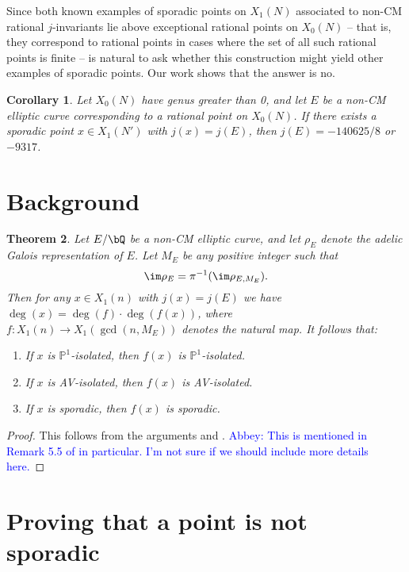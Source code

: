 \documentclass[11pt,reqno]{amsart}
\theoremstyle{plain}
\newtheorem{theorem}{Theorem}%
\newtheorem{corollary}[theorem]{Corollary}
\theoremstyle{definition}
\newcommand{\Q}{\bQ}
\newcommand{\abbey}[1]{\textcolor{blue}{Abbey: #1}}
\begin{document}
Since both known examples of sporadic points on $X_1(N)$ associated to non-CM rational $j$-invariants lie above exceptional rational points on $X_0(N)$ -- that is, they correspond to rational points in cases where the set of all such rational points is finite -- is natural to ask whether this construction might yield other examples of sporadic points. Our work shows that the answer is no.
\begin{corollary}
Let $X_0(N)$ have genus greater than 0, and let $E$ be a non-CM elliptic curve corresponding to a rational point on $X_0(N)$. If there exists a sporadic point $x \in X_1(N')$ with $j(x)=j(E)$, then $j(E) =-140625/8$ or $-9317$.
\end{corollary}

\section{Background}

\begin{theorem}
Let $E/\Q$ be a non-CM elliptic curve, and let $\rho_E$ denote the adelic Galois representation of $E$. Let $M_E$ be any positive integer such that
\[
\im \rho_E=\pi^{-1}(\im \rho_{E, M_E}).
\]
Then for any $x \in X_1(n)$ with $j(x)=j(E)$ we have $\deg(x)=\deg(f)\cdot \deg(f(x))$, where $f: X_1(n) \rightarrow X_1(\gcd(n,M_E))$ denotes the natural map. It follows that:
\begin{enumerate}
\item If $x$ is $\mathbb{P}^1$-isolated, then $f(x)$ is $\mathbb{P}^1$-isolated.
\item If $x$ is AV-isolated, then $f(x)$ is AV-isolated.
\item If $x$ is sporadic, then $f(x)$ is sporadic.
\end{enumerate}
\end{theorem}

\begin{proof}
This follows from the arguments \cite[$\S5.3$]{BELOV} and \cite[Theorem 4.3]{BELOV}. \abbey{This is mentioned in Remark 5.5 of \cite{BELOV} in particular. I'm not sure if we should include more details here.}
\end{proof}

\section{Proving that a point is not sporadic}
\end{document}
